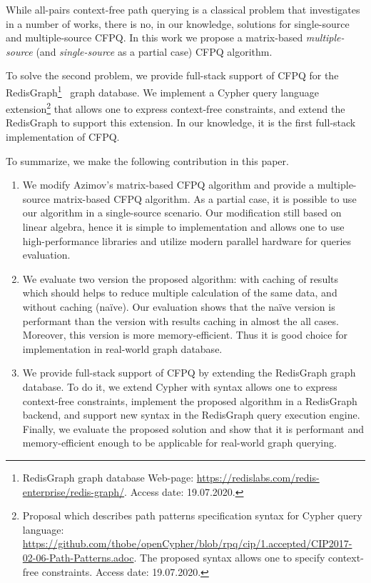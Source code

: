 While all-pairs context-free path querying is a classical problem that investigates in a number of works, there is no, in our knowledge, solutions for single-source and multiple-source CFPQ.
In this work we propose a matrix-based \textit{multiple-source} (and \textit{single-source} as a partial case) CFPQ algorithm.

To solve the second problem, we provide full-stack support of CFPQ for the RedisGraph\footnote{RedisGraph graph database Web-page: \url{https://redislabs.com/redis-enterprise/redis-graph/}. Access date: 19.07.2020.}~\cite{8778293} graph database.
We implement a Cypher query language extension\footnote{Proposal which describes path patterns specification syntax for Cypher query language: \url{https://github.com/thobe/openCypher/blob/rpq/cip/1.accepted/CIP2017-02-06-Path-Patterns.adoc}. The proposed syntax allows one to specify context-free constraints. Access date: 19.07.2020.} that allows one to express context-free constraints, and extend the RedisGraph to support this extension.
In our knowledge, it is the first full-stack implementation of CFPQ.

To summarize, we make the following contribution in this paper.
\begin{enumerate}
	\item We modify Azimov's matrix-based CFPQ algorithm and provide a multiple-source matrix-based CFPQ algorithm.
	As a partial case, it is possible to use our algorithm in a single-source scenario.
	Our modification still based on linear algebra, hence it is simple to implementation and allows one to use high-performance libraries and utilize modern parallel hardware for queries evaluation. 
	\item We evaluate two version the proposed algorithm: with caching of results which should helps to reduce multiple calculation of the same data, and without caching (na\"{i}ve).
	Our evaluation shows that the na\"{i}ve version is performant than the version with results caching in almost the all cases. Moreover, this version is more memory-efficient. Thus it is good choice for implementation in real-world graph database.
	\item We provide full-stack support of CFPQ by extending the RedisGraph graph database.
	To do it, we extend Cypher with syntax allows one to express context-free constraints, implement the proposed algorithm in a RedisGraph backend, and support new syntax in the RedisGraph query execution engine. Finally, we evaluate the proposed solution and show that it is performant and memory-efficient enough to be applicable for real-world graph querying.
\end{enumerate}